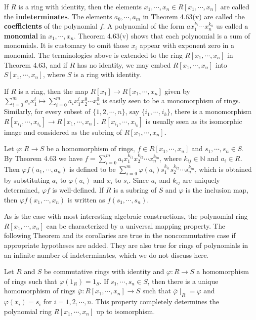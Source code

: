 If $R$ is a ring with identity, then the elements $x_1,\cdots,x_n\in R[x_1,\cdots,x_n]$ are called the \textbf{indeterminates}. The elements $a_0,\cdots,a_m$ in Theorem 4.63(v) are called the \textbf{coefficients} of the polynomial $f$. A polynomial of the form $ax_1^{k_1}\cdots x_n^{k_n}$ us called a \textbf{monomial} in $x_1,\cdots,x_n$. Theorem 4.63(v) shows that each polynomial is a sum of monomials. It is customary to omit those $x_i$ appear with exponent zero in a monomial. The terminologies above is extended to the ring $R[x_1,\cdots,x_n]$ in Theorem 4.63, and if $R$ has no identity, we may embed $R[x_1,\cdots,x_n]$ into $S[x_1,\cdots,x_n]$, where $S$ is a ring with identity.\par
If $R$ is a ring, then the map $R[x_1]\to R[x_1,\cdots,x_n]$ given by $\sum_{i=0}^ma_ix_1^i\mapsto\sum_{i=0}^ma_ix_1^ix_2^0\cdots x_n^0$ is easily seen to be a monomorphism of rings. Similarly, for every subset of $\{1,2,\cdots,n\}$, say $\{i_1,\cdots,i_k\}$, there is a monomorphism $R[x_{i_1},\cdots,x_{i_k}]\to R[x_1,\cdots,x_n]$. $R[x_{i_1},\cdots,x_{i_k}]$ is usually seen as its isomorphic image and considered as the subring of $R[x_1,\cdots,x_n]$.\par
Let $\varphi:R\to S$ be a homomorphism of rings, $f\in R[x_1,\cdots,x_n]$ and $s_1,\cdots,s_n\in S$. By Theorem 4.63 we have $f=\sum_{i=0}^ma_ix_1^{k_{i1}}x_2^{k_{i2}}\cdots x_n^{k_{in}}$, where $k_{ij}\in\mathbb{N}$ and $a_i\in R$. Then $\varphi f(a_1,\cdots,a_n)$ is defined to be $\sum_{i=0}^m\varphi(a_i)s_1^{k_{i1}}s_2^{k_{i2}}\cdots s_n^{k_{in}}$, which is obtained by substituting $a_i$ to $\varphi(a_i)$ and $x_i$ to $s_i$. Since $a_i$ and $k_{ij}$ are uniquely determined, $\varphi f$ is well-defined. If $R$ is a subring of $S$ and $\varphi$ is the inclusion map, then $\varphi f(x_1,\cdots,x_n)$ is written as $f(s_1,\cdots,s_n)$.\par
As is the case with most interesting algebraic constructions, the polynomial ring $R[x_1,\cdots,x_n]$ can be characterized by a universal mapping property. The following Theorem and its corollaries are true in the noncommutative case if appropriate hypotheses are added. They are also true for rings of polynomials in an infinite number of indeterminates, which we do not discuss here.
\begin{theorem}
Let $R$ and $S$ be commutative rings with identity and $\varphi:R\to S$ a homomorphism of rings such that $\varphi(1_R)=1_S$. If $s_1,\cdots,s_n\in S$, then there is a unique homomorphism of rings $\overline{\varphi}:R[x_1,\cdots,x_n]\to S$ such that $\overline{\varphi}\mid_R=\varphi$ and $\overline{\varphi}(x_i)=s_i$ for $i=1,2,\cdots,n$. This property completely determines the polynomial ring $R[x_1,\cdots,x_n]$ up to isomorphism.
\end{theorem}
